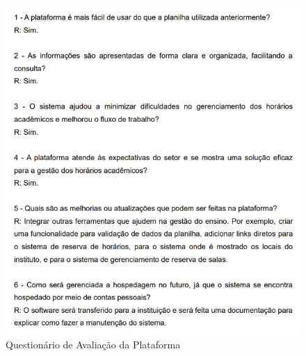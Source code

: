 \begin{apendicesenv}
\begin{figure}[htb] 
    \centering
    \includegraphics[width=1\textwidth]{Figuras/QAvaliacao.png}
    \caption{Questionário de Avaliação da Plataforma}
    \label{fig_qavaliacao}
\end{figure}

\end{apendicesenv}